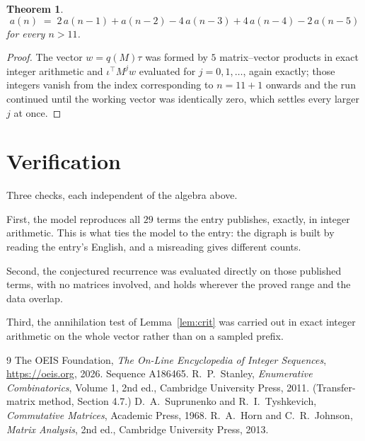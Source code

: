 \documentclass[11pt,a4paper]{article}
\theoremstyle{plain}
\newtheorem{theorem}{Theorem}
\theoremstyle{definition}
\begin{document}
\begin{theorem}
\[
a(n)\;=\;2\,a(n-1) + a(n-2) - 4\,a(n-3) + 4\,a(n-4) - 2\,a(n-5)
\]
for every $n>11$.
\end{theorem}

\begin{proof}
The vector $w=q(M)\tau$ was formed by $5$ matrix--vector products in exact integer
arithmetic and $\iota^{\!\top}M^{j}w$ evaluated for $j=0,1,\dots$, again exactly; those
integers vanish from the index corresponding to $n=11+1$ onwards and the run continued
until the working vector was identically zero, which settles every larger $j$ at once.
\end{proof}

\section{Verification}

Three checks, each independent of the algebra above.

First, the model reproduces all $29$ terms the entry publishes, exactly, in integer
arithmetic. This is what ties the model to the entry: the digraph is built by reading the
entry's English, and a misreading gives different counts.

Second, the conjectured recurrence was evaluated directly on those published terms, with no
matrices involved, and holds wherever the proved range and the data overlap.

Third, the annihilation test of Lemma~\ref{lem:crit} was carried out in exact integer
arithmetic on the whole vector rather than on a sampled prefix.

\begin{thebibliography}{9}
 The OEIS Foundation, \emph{The On-Line Encyclopedia of Integer
Sequences}, \url{https://oeis.org}, 2026. Sequence A186465.
 R.~P.~Stanley, \emph{Enumerative Combinatorics}, Volume 1, 2nd ed.,
Cambridge University Press, 2011. (Transfer-matrix method, Section 4.7.)
 D.~A.~Suprunenko and R.~I.~Tyshkevich, \emph{Commutative Matrices},
Academic Press, 1968.
 R.~A.~Horn and C.~R.~Johnson, \emph{Matrix Analysis}, 2nd ed., Cambridge
University Press, 2013.
\end{thebibliography}
\end{document}
